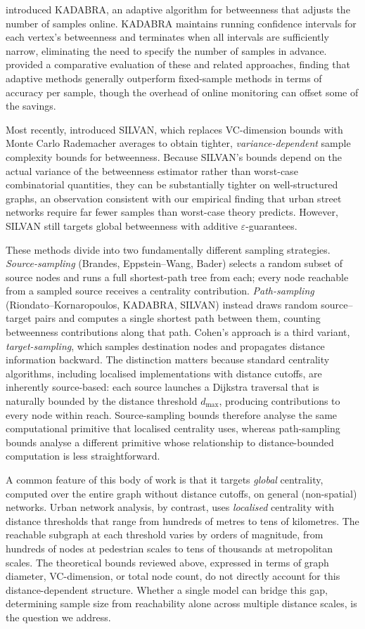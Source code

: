 \citet{Borassi2019} introduced KADABRA, an adaptive algorithm for betweenness that adjusts the number of samples online. KADABRA maintains running confidence intervals for each vertex's betweenness and terminates when all intervals are sufficiently narrow, eliminating the need to specify the number of samples in advance. \citet{Bergamini2019} provided a comparative evaluation of these and related approaches, finding that adaptive methods generally outperform fixed-sample methods in terms of accuracy per sample, though the overhead of online monitoring can offset some of the savings.

Most recently, \citet{Pellegrina2023} introduced SILVAN, which replaces VC-dimension bounds with Monte Carlo Rademacher averages to obtain tighter, \emph{variance-dependent} sample complexity bounds for betweenness. Because SILVAN's bounds depend on the actual variance of the betweenness estimator rather than worst-case combinatorial quantities, they can be substantially tighter on well-structured graphs, an observation consistent with our empirical finding that urban street networks require far fewer samples than worst-case theory predicts. However, SILVAN still targets global betweenness with additive $\varepsilon$-guarantees.

These methods divide into two fundamentally different sampling strategies. \emph{Source-sampling} (Brandes, Eppstein--Wang, Bader) selects a random subset of source nodes and runs a full shortest-path tree from each; every node reachable from a sampled source receives a centrality contribution. \emph{Path-sampling} (Riondato--Kornaropoulos, KADABRA, SILVAN) instead draws random source--target pairs and computes a single shortest path between them, counting betweenness contributions along that path. Cohen's approach is a third variant, \emph{target-sampling}, which samples destination nodes and propagates distance information backward. The distinction matters because standard centrality algorithms, including localised implementations with distance cutoffs, are inherently source-based: each source launches a Dijkstra traversal that is naturally bounded by the distance threshold $d_{\max}$, producing contributions to every node within reach. Source-sampling bounds therefore analyse the same computational primitive that localised centrality uses, whereas path-sampling bounds analyse a different primitive whose relationship to distance-bounded computation is less straightforward.

A common feature of this body of work is that it targets \emph{global} centrality, computed over the entire graph without distance cutoffs, on general (non-spatial) networks. Urban network analysis, by contrast, uses \emph{localised} centrality with distance thresholds that range from hundreds of metres to tens of kilometres. The reachable subgraph at each threshold varies by orders of magnitude, from hundreds of nodes at pedestrian scales to tens of thousands at metropolitan scales. The theoretical bounds reviewed above, expressed in terms of graph diameter, VC-dimension, or total node count, do not directly account for this distance-dependent structure. Whether a single model can bridge this gap, determining sample size from reachability alone across multiple distance scales, is the question we address.
